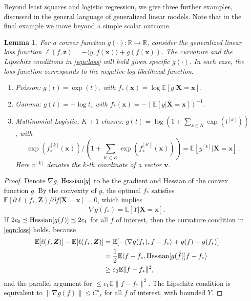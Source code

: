 \documentclass[11pt]{article}
\newtheorem{lemma}{Lemma}
\numberwithin{equation}{section}
\theoremstyle{definition}
\newcommand{\E}{\mathbb{E}}
\newcommand{\bz}{\bm{z}}
\newcommand{\bZ}{\bm{Z}}
\newcommand{\bx}{\bm{x}}
\newcommand{\bX}{\bm{X}}
\newcommand{\bv}{\bm{v}}
\begin{document}
\begin{appendices}
Beyond least squares and logistic regression, we give three further examples, discussed in the general language of generalized linear models. Note that in the final example we move beyond a simple scalar outcome.
\begin{lemma}
	\label{lem:glms}
For a convex function $g(\cdot):\mathbb{R} \rightarrow \mathbb{R}$, consider the generalized linear loss function $\ell(f, \bz) = -\langle y, f(\bx)\rangle + g(f(\bx))$. The curvature and the Lipschitz conditions in \eqref{eqn:loss} will hold given specific $g(\cdot)$. In each case, the loss function corresponds to the negative log likelihood function.
\begin{enumerate}
	\item Poisson: $g(t)=\exp(t)$, with $f_*(\bx) = \log \E[y|\bX = \bx]$. 
	\item Gamma: $g(t)=-\log t$, with $f_*(\bx) = -(\E[y|\bX = \bx])^{-1}$. 
	\item Multinomial Logistic, $K+1$ classes: $g(t) = \log (1+\sum_{k\in K} \exp(t^{[k]}))$, with $$\exp(f_*^{[k]}(\bx))/(1+\sum_{k'\in K} \exp(f_*^{[k']}(\bx))) = \E[y^{[k]}|\bX = \bx].$$ Here $v^{[k]}$ denotes the $k$-th coordinate of a vector $\bv$.
\end{enumerate}
\end{lemma}
\begin{proof}
	Denote $\nabla g$, ${\rm Hessian}[g]$ to be the gradient and Hessian of the convex function $g$.
	By the convexity of $g$, the optimal $f_*$ satisfies $\E[\partial \ell(f_*, \bZ) / \partial f |\bX = \bx] = 0$, which implies
	\begin{align*}
		\nabla g( f_* ) = \E[ Y | \bX = \bx].
	\end{align*} 
	If $2 c_0 \preceq {\rm Hessian}[g(f)] \preceq 2c_1$ for all $f$ of interest, then the curvature condition in \eqref{eqn:loss} holds, because
	\begin{align*}
		\E [\ell(f, \bZ)] - \E [\ell (f_*, \bZ)] & = \E[ - \langle \nabla g(f_*), f - f_* \rangle + g(f) - g(f_*) ] \\
		& = \frac{1}{2} \E\langle f-f_* , {\rm Hessian}[g(\tilde f)] f-f_* \rangle \\
		& \geq  c_0 \E \| f-f_* \|^2,
	\end{align*}
	and the parallel argument for $\leq c_1 \E \| f-f_* \|^2$. The Lipschitz condition is equivalent to $\| \nabla g(f) \| \leq C'_\ell$ for all $f$ of interest, with bounded $Y$. 
	

\end{proof}
\end{appendices}
\end{document}
